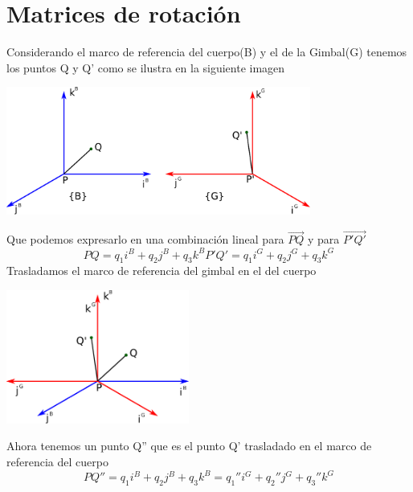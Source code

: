 \section{Matrices de rotación}
Considerando el marco de referencia del cuerpo(B) y el de la Gimbal(G) tenemos los puntos Q y Q'
como se ilustra en la siguiente imagen
\begin{center}
	\includegraphics[width=0.75\textwidth]{Contenido/Cuerpo/Capitulo3/Fig13.eps}
	\label{fig:ModeloMat:Fig1}
\end{center}
Que podemos expresarlo en una combinación lineal para $\overrightarrow{PQ}$ y para $\overrightarrow{P'Q'}$
\begin{subequations}
	\begin{equation}
		PQ = q_1i^B + q_2j^B + q_3k^B
	\end{equation}
	\begin{equation}
		P'Q' = q_1i^G + q_2j^G + q_3k^G
	\end{equation}
\end{subequations}
Trasladamos el marco de referencia del gimbal en el del cuerpo
\begin{center}
	\includegraphics[width=0.45\textwidth]{Contenido/Cuerpo/Capitulo3/Fig14.eps}
	\label{fig:ModeloMat:Fig1}
\end{center}
Ahora tenemos un punto Q'' que es el punto Q' trasladado en el marco de referencia del cuerpo
\begin{equation}
	PQ'' = q_1i^B + q_2j^B + q_3k^B = q_1''i^G + q_2''j^G + q_3''k^G
\end{equation}
